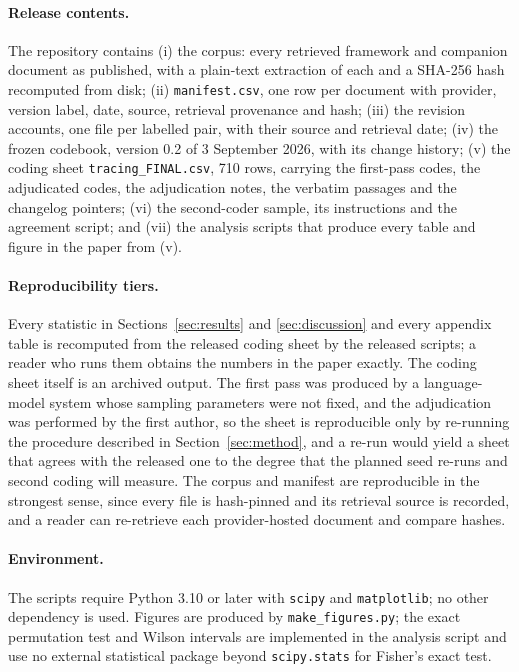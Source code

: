\documentclass{article}
\begin{document}
\paragraph{Release contents.} The repository contains (i) the corpus: every retrieved framework and companion document as published, with a plain-text extraction of each and a SHA-256 hash recomputed from disk; (ii) \texttt{manifest.csv}, one row per document with provider, version label, date, source, retrieval provenance and hash; (iii) the revision accounts, one file per labelled pair, with their source and retrieval date; (iv) the frozen codebook, version 0.2 of 3 September 2026, with its change history; (v) the coding sheet \texttt{tracing\_FINAL.csv}, 710 rows, carrying the first-pass codes, the adjudicated codes, the adjudication notes, the verbatim passages and the changelog pointers; (vi) the second-coder sample, its instructions and the agreement script; and (vii) the analysis scripts that produce every table and figure in the paper from (v).

\paragraph{Reproducibility tiers.} Every statistic in Sections~\ref{sec:results} and \ref{sec:discussion} and every appendix table is recomputed from the released coding sheet by the released scripts; a reader who runs them obtains the numbers in the paper exactly. The coding sheet itself is an archived output. The first pass was produced by a language-model system whose sampling parameters were not fixed, and the adjudication was performed by the first author, so the sheet is reproducible only by re-running the procedure described in Section~\ref{sec:method}, and a re-run would yield a sheet that agrees with the released one to the degree that the planned seed re-runs and second coding will measure. The corpus and manifest are reproducible in the strongest sense, since every file is hash-pinned and its retrieval source is recorded, and a reader can re-retrieve each provider-hosted document and compare hashes.

\paragraph{Environment.} The scripts require Python 3.10 or later with \texttt{scipy} and \texttt{matplotlib}; no other dependency is used. Figures are produced by \texttt{make\_figures.py}; the exact permutation test and Wilson intervals are implemented in the analysis script and use no external statistical package beyond \texttt{scipy.stats} for Fisher's exact test.
\end{document}
